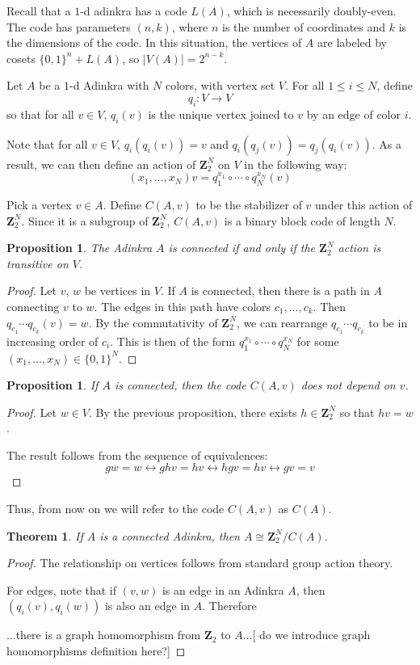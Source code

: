 \documentclass[12pt,twoside,singlespace]{article}
\numberwithin{equation}{section}
\newtheorem{thm}[equation]{Theorem}
\newtheorem{prop}[equation]{Proposition}
\theoremstyle{definition}
\newcommand{\ZZ}{\mathbf{Z}}
\begin{document}
Recall that a $1$-d adinkra has a code $L(A)$, which is necessarily doubly-even. The code has parameters $(n,k)$, where $n$ is the number of coordinates and $k$ is the dimensions of the code. In this situation, the vertices of $A$ are labeled by cosets $\{0,1\}^n + L(A)$, so $|V(A)| = 2^{n-k}$.


Let $A$ be a $1$-d Adinkra with $N$ colors, with vertex set $V$.  For all $1\le i\le N$, define
\[q_i:V\to V\]
so that for all $v\in V$, $q_i(v)$ is the unique vertex joined to $v$ by an edge of color $i$.

Note that for all $v\in V$, $q_i(q_i(v))=v$ and $q_i(q_j(v))=q_j(q_i(v))$.  As a result, we can then define an action of $\ZZ_2^N$ on $V$ in the following way:
\[(x_1,\ldots,x_N)v=q_1^{x_1}\circ\cdots\circ q_N^{x_N}(v)\]

Pick a vertex $v\in A$.  Define $C(A,v)$ to be the stabilizer of $v$ under this action of $\ZZ_2^N$.  Since it is a subgroup of $\ZZ_2^N$, $C(A,v)$ is a binary block code of length $N$.

\begin{prop}
The Adinkra $A$ is connected if and only if the $\ZZ_2^N$ action is transitive on $V$.
\end{prop}
\begin{proof}
Let $v$, $w$ be vertices in $V$.  If $A$ is connected, then there is a path in $A$ connecting $v$ to $w$.  The edges in this path have colors $c_1,\ldots,c_k$.  Then $q_{c_1}\cdots q_{c_k}(v)=w$.  By the commutativity of $\ZZ_2^N$, we can rearrange $q_{c_1}\cdots q_{c_k}$ to be in increasing order of $c_i$.  This is then of the form $q_1^{x_1}\circ \cdots \circ q_N^{x_N}$ for some $(x_1,\ldots,x_N)\in \{0,1\}^N$.
\end{proof}

\begin{prop}
If $A$ is connected, then the code $C(A,v)$ does not depend on $v$.
\end{prop}
\begin{proof}
Let $w\in V$.  By the previous proposition, there exists $h\in \ZZ_2^N$ so that $hv=w$.

The result follows from the sequence of equivalences:
\[gw=w\leftrightarrow ghv=hv \leftrightarrow hgv=hv \leftrightarrow gv=v\]
\end{proof}
Thus, from now on we will refer to the code $C(A,v)$ as $C(A)$.


\begin{thm}
If $A$ is a connected Adinkra, then $A\cong \ZZ_2^N/C(A)$.
\end{thm}
\begin{proof}
The relationship on vertices follows from standard group action theory.

For edges, note that if $(v,w)$ is an edge in an Adinkra $A$, then $(q_i(v),q_i(w))$ is also an edge in $A$.  Therefore 

...there is a graph homomorphism from $\ZZ_2$ to $A$...[ do we introduce graph homomorphisms definition here?]
\end{proof}
\end{document}

